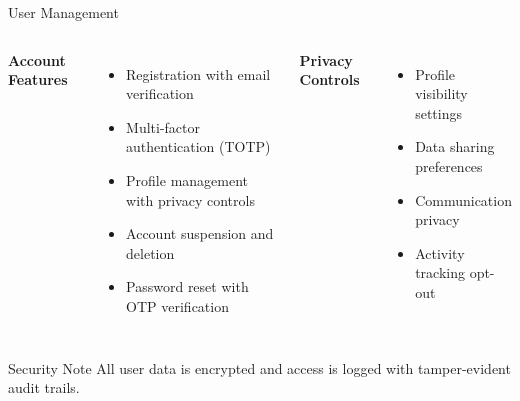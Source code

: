 \documentclass[aspectratio=169]{beamer}
\begin{document}
\begin{frame}{User Management}
\begin{columns}
\textbf{Account Features}
\begin{itemize}
    \item Registration with email verification
    \item Multi-factor authentication (TOTP)
    \item Profile management with privacy controls
    \item Account suspension and deletion
    \item Password reset with OTP verification
\end{itemize}

\textbf{Privacy Controls}
\begin{itemize}
    \item Profile visibility settings
    \item Data sharing preferences
    \item Communication privacy
    \item Activity tracking opt-out
\end{itemize}
\end{columns}

\vspace{0.3cm}
\begin{alertblock}{Security Note}
All user data is encrypted and access is logged with tamper-evident audit trails.
\end{alertblock}
\end{frame}
\end{document}
